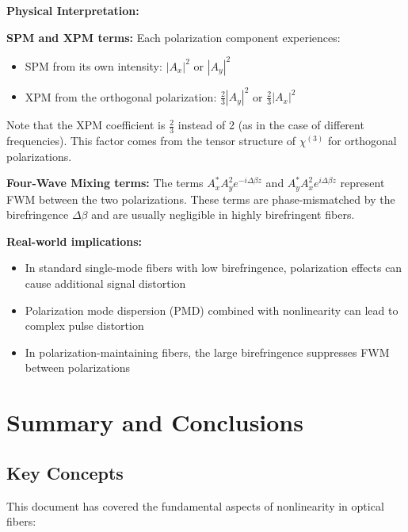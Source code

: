 \documentclass[a4paper, 11pt]{article}
\begin{document}
\begin{physical}
\textbf{Physical Interpretation:}

\textbf{SPM and XPM terms:} Each polarization component experiences:
\begin{itemize}
    \item SPM from its own intensity: $|A_x|^2$ or $|A_y|^2$
    \item XPM from the orthogonal polarization: $\frac{2}{3}|A_y|^2$ or $\frac{2}{3}|A_x|^2$
\end{itemize}

Note that the XPM coefficient is $\frac{2}{3}$ instead of 2 (as in the case of different frequencies). This factor comes from the tensor structure of $\chi^{(3)}$ for orthogonal polarizations.

\textbf{Four-Wave Mixing terms:} The terms $A_x^* A_y^2 e^{-i\Delta\beta z}$ and $A_y^* A_x^2 e^{i\Delta\beta z}$ represent FWM between the two polarizations. These terms are phase-mismatched by the birefringence $\Delta\beta$ and are usually negligible in highly birefringent fibers.

\textbf{Real-world implications:}
\begin{itemize}
    \item In standard single-mode fibers with low birefringence, polarization effects can cause additional signal distortion
    \item Polarization mode dispersion (PMD) combined with nonlinearity can lead to complex pulse distortion
    \item In polarization-maintaining fibers, the large birefringence suppresses FWM between polarizations
\end{itemize}
\end{physical}

\section{Summary and Conclusions}

\subsection{Key Concepts}

This document has covered the fundamental aspects of nonlinearity in optical fibers:
\end{document}
